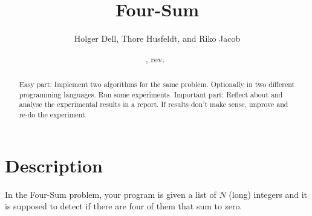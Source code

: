\documentclass[nobib]{tufte-handout}
\title{Four-Sum}
\author{Holger Dell, Thore Husfeldt, and Riko Jacob}
\date{\GITAuthorDate, rev.~\GITAbrHash}
\begin{document}
\maketitle
\begin{abstract}
  Easy part: Implement two algorithms for the same problem.
  Optionally in two different programming languages.
  Run some experiments.
  Important part: Reflect about and analyse the experimental results in a report. If results don't make sense, improve and re-do the experiment.
\end{abstract}


\section{Description}

In the Four-Sum problem, your program is given a list of $N$ (long) integers and it is supposed to detect if there are four of them that sum to zero.%
\end{document}
